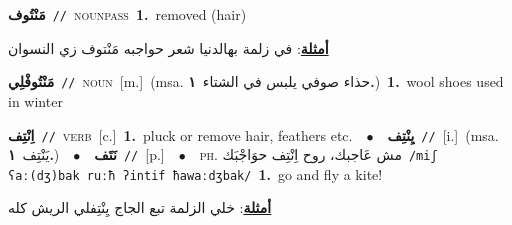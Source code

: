 \documentclass[10pt,a4paper,twoside]{article} %
\begin{document}
\begin{multicols}{2}
{{{{{{{{{{{{{\setlength\topsep{0pt}\textbf{\foreignlanguage{arabic}{مَنْتُوف}}\ {\color{gray}\texttt{//}\color{black}}\ \textsc{noun\textunderscore pass}\ \textbf{1.}~removed (hair)\  \begin{flushright}\color{gray}\foreignlanguage{arabic}{\textbf{\underline{\foreignlanguage{arabic}{أمثلة}}}: في زلمة بهالدنيا شعر حواجبه مَنْتوف زي النسوان}\end{flushright}\color{black}} \vspace{2mm}

{\setlength\topsep{0pt}\textbf{\foreignlanguage{arabic}{مَنْتُوفْلِي}}\ {\color{gray}\texttt{//}\color{black}}\ \textsc{noun}\ [m.]\ \color{gray}(msa. \foreignlanguage{arabic}{حذاء صوفي يلبس في الشتاء}~\foreignlanguage{arabic}{\textbf{١.}})\color{black}\ \textbf{1.}~wool shoes used in winter\ 

{\setlength\topsep{0pt}\textbf{\foreignlanguage{arabic}{اِنْتِف}}\ {\color{gray}\texttt{//}\color{black}}\ \textsc{verb}\ [c.]\ \textbf{1.}~pluck or remove hair, feathers etc.\ \ $\bullet$\ \ \setlength\topsep{0pt}\textbf{\foreignlanguage{arabic}{يِنْتِف}}\ {\color{gray}\texttt{//}\color{black}}\ [i.]\ \color{gray}(msa. \foreignlanguage{arabic}{يَنْتِف}~\foreignlanguage{arabic}{\textbf{١.}})\color{black}\ \ $\bullet$\ \ \setlength\topsep{0pt}\textbf{\foreignlanguage{arabic}{نَتَف}}\ {\color{gray}\texttt{//}\color{black}}\ [p.]\ \ $\bullet$\ \ \textsc{ph.} \color{gray} \foreignlanguage{arabic}{مش عَاجبك، روح اِنْتِف حوَاجْبَك}\color{black}\ {\color{gray}\texttt{/{\sffamily miʃ ʕaː(dʒ)bak ruːħ ʔintif ħawaːdʒbak}/}\color{black}}\ \textbf{1.}~go and fly a kite!\  \begin{flushright}\color{gray}\foreignlanguage{arabic}{\textbf{\underline{\foreignlanguage{arabic}{أمثلة}}}: خلي الزلمة تبع الجاج يِنْتِفلي الريش كله}\end{flushright}\color{black}} \vspace{2mm}

}}}}}}}}}}}}}
\end{multicols}
\end{document}
